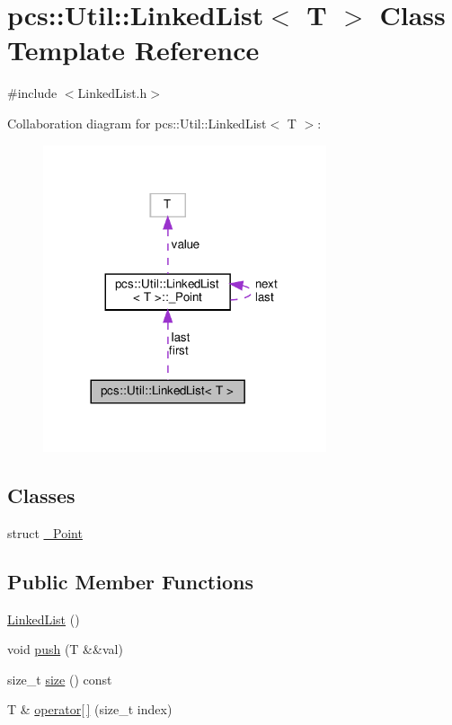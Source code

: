 \hypertarget{classpcs_1_1Util_1_1LinkedList}{}\section{pcs\+:\+:Util\+:\+:Linked\+List$<$ T $>$ Class Template Reference}
\label{classpcs_1_1Util_1_1LinkedList}


{\ttfamily \#include $<$Linked\+List.\+h$>$}



Collaboration diagram for pcs\+:\+:Util\+:\+:Linked\+List$<$ T $>$\+:\nopagebreak
\begin{figure}[H]
\begin{center}
\leavevmode
\includegraphics[width=236pt]{classpcs_1_1Util_1_1LinkedList__coll__graph}
\end{center}
\end{figure}
\subsection*{Classes}
\begin{DoxyCompactItemize}
\item 
struct \hyperlink{structpcs_1_1Util_1_1LinkedList_1_1__Point}{\+\_\+\+Point}
\end{DoxyCompactItemize}
\subsection*{Public Member Functions}
\begin{DoxyCompactItemize}
\item 
\hyperlink{classpcs_1_1Util_1_1LinkedList_ac57e454c23a32aac315f04cd2923224a}{Linked\+List} ()
\item 
void \hyperlink{classpcs_1_1Util_1_1LinkedList_a79ddaedb4fbd61886c4326a9a9c34c5d}{push} (T \&\&val)
\item 
size\+\_\+t \hyperlink{classpcs_1_1Util_1_1LinkedList_ac778698256b41a8085d3654056a4093a}{size} () const
\item 
T \& \hyperlink{classpcs_1_1Util_1_1LinkedList_a76e86131234ae5242e02a199ae2a8645}{operator\mbox{[}$\,$\mbox{]}} (size\+\_\+t index)
\end{DoxyCompactItemize}
